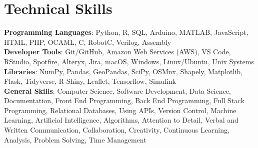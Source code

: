 \documentclass[letterpaper,10pt]{article}
\begin{document}
\section{Technical Skills}
 \begin{itemize}[leftmargin=0.15in, label={}]
    \small{\item{
     \textbf{Programming Languages}{: Python, R, SQL, Arduino, MATLAB, JavaScript, HTML, PHP, OCAML, C, RobotC, Verilog, Assembly} \\
     \textbf{Developer Tools}{: Git/GitHub, Amazon Web Services (AWS), VS Code, RStudio, Spotfire, Alteryx, Jira, macOS, Windows, Linux/Ubuntu, Unix Systems} \\
     \textbf{Libraries}{: NumPy, Pandas, GeoPandas, SciPy, OSMnx, Shapely, Matplotlib, Flask, Tidyverse, R Shiny, Leaflet, Tensorflow, Simulink} \\
     \textbf{General Skills}{: Computer Science, Software Development, Data Science, Documentation, Front End Programming, Back End Programming, Full Stack Programming, Relational Databases, Using APIs, Version Control, Machine Learning, Artificial Intelligence, Algorithms, Attention to Detail, Verbal and Written Communication, Collaboration, Creativity, Continuous Learning, Analysis, Problem Solving, Time Management
    }}}
 \end{itemize}


\end{document}
